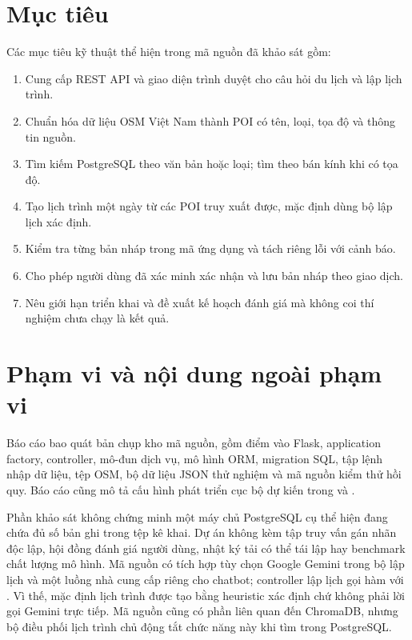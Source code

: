 \section{Mục tiêu}

Các mục tiêu kỹ thuật thể hiện trong mã nguồn đã khảo sát gồm:
\begin{enumerate}[leftmargin=1.8em,itemsep=2pt,parsep=0pt,topsep=3pt]
    \item Cung cấp REST API và giao diện trình duyệt cho câu hỏi du lịch và lập lịch trình.
    \item Chuẩn hóa dữ liệu OSM Việt Nam thành POI có tên, loại, tọa độ và thông tin nguồn.
    \item Tìm kiếm PostgreSQL theo văn bản hoặc loại; tìm theo bán kính khi có tọa độ.
    \item Tạo lịch trình một ngày từ các POI truy xuất được, mặc định dùng bộ lập lịch xác định.
    \item Kiểm tra từng bản nháp trong mã ứng dụng và tách riêng lỗi với cảnh báo.
    \item Cho phép người dùng đã xác minh xác nhận và lưu bản nháp theo giao dịch.
    \item Nêu giới hạn triển khai và đề xuất kế hoạch đánh giá mà không coi thí nghiệm chưa chạy là kết quả.
\end{enumerate}

\section{Phạm vi và nội dung ngoài phạm vi}

Báo cáo bao quát bản chụp kho mã nguồn, gồm điểm vào Flask, application factory, controller, mô-đun dịch vụ, mô hình ORM, migration SQL, tập lệnh nhập dữ liệu, tệp OSM, bộ dữ liệu JSON thử nghiệm và mã nguồn kiểm thử hồi quy. Báo cáo cũng mô tả cấu hình phát triển cục bộ dự kiến trong  và .

Phần khảo sát không chứng minh một máy chủ PostgreSQL cụ thể hiện đang chứa đủ số bản ghi trong tệp kê khai. Dự án không kèm tập truy vấn gán nhãn độc lập, hội đồng đánh giá người dùng, nhật ký tải có thể tái lập hay benchmark chất lượng mô hình. Mã nguồn có tích hợp tùy chọn Google Gemini trong bộ lập lịch và một luồng nhà cung cấp riêng cho chatbot; controller lập lịch gọi hàm với . Vì thế, mặc định lịch trình được tạo bằng heuristic xác định chứ không phải lời gọi Gemini trực tiếp. Mã nguồn cũng có phần liên quan đến ChromaDB, nhưng bộ điều phối lịch trình chủ động tắt chức năng này khi tìm trong PostgreSQL.

